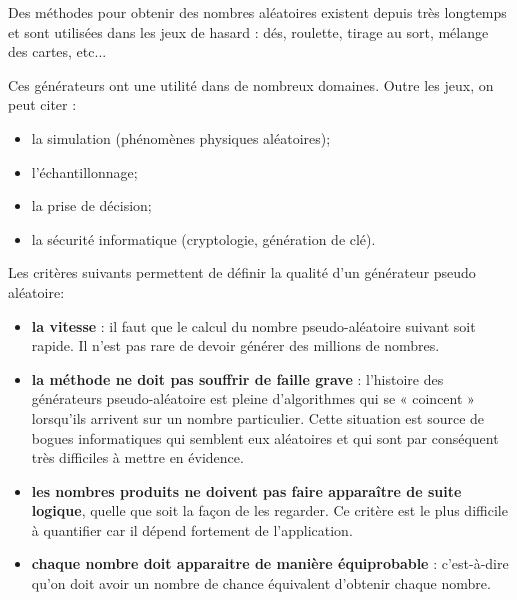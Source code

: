 \documentclass[t,11pt]{article}
\begin{document}
Des méthodes pour obtenir des nombres aléatoires existent depuis très longtemps et sont utilisées dans les jeux de hasard : dés, roulette, tirage au sort, mélange des cartes, etc... 

\vspace{0.2cm}
Ces générateurs ont une utilité dans de nombreux domaines. Outre les jeux, on peut citer :
\begin{itemize} 
\item la simulation (phénomènes physiques aléatoires);
\item l'échantillonnage;
\item la prise de décision;
\item la sécurité informatique (cryptologie, génération de clé).
\end{itemize}

\vspace{0.5cm}

Les critères suivants permettent de définir la qualité d'un générateur pseudo aléatoire:
\begin{itemize}
\item    \textbf{la vitesse} : il faut que le calcul du nombre pseudo-aléatoire suivant soit rapide. Il n'est pas rare de devoir générer des millions de nombres.
\item  \textbf{la méthode ne doit pas souffrir de faille grave} : l'histoire des générateurs pseudo-aléatoire est pleine d'algorithmes qui se « coincent » lorsqu'ils arrivent sur un nombre particulier. Cette situation est source de bogues informatiques qui semblent eux aléatoires et qui sont par conséquent très difficiles à mettre en évidence.

\item   \textbf{les nombres produits ne doivent pas faire apparaître de suite logique}, quelle que soit la façon de les regarder. Ce critère est le plus difficile à quantifier car il dépend fortement de l'application.

\item \textbf{chaque nombre doit apparaitre de manière équiprobable} : c'est-à-dire qu'on doit avoir un nombre de chance équivalent d'obtenir chaque nombre.
\end{itemize}

\end{document}
